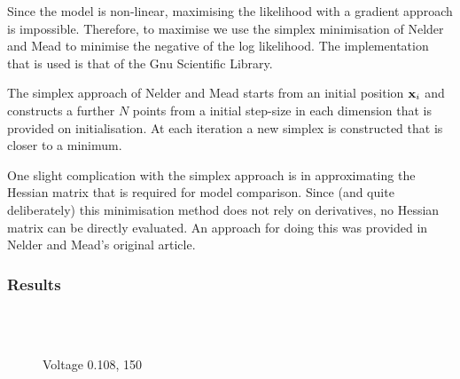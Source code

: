Since the model is non-linear,
maximising the likelihood with a gradient approach is impossible.
Therefore, to maximise 
we use the simplex minimisation of Nelder and Mead\cite{Nelder1965}
to minimise the negative of the log likelihood.
The implementation that is used is that of the Gnu Scientific Library.

The simplex approach of Nelder and Mead\cite{Nelder1965} starts from an initial position $\mathbf{x}_i$ and
constructs a further $N$ points from a initial step-size in each dimension that is provided on initialisation.
At each iteration a new simplex is constructed that is closer to a minimum.

One slight complication with the simplex approach is in approximating the Hessian matrix
that is required for model comparison.
Since (and quite deliberately)
this minimisation method does not rely on derivatives,
no Hessian matrix can be directly evaluated.
An approach for doing this was provided in  Nelder and Mead's original article\cite{Nelder1965}.



\subsubsection{Results}



\begin{figure}[t]%
  \centering
  \\
  \\
  \label{fig:plot_bubble_fit_108_150}
\caption{Voltage 0.108, 150}
\end{figure}


